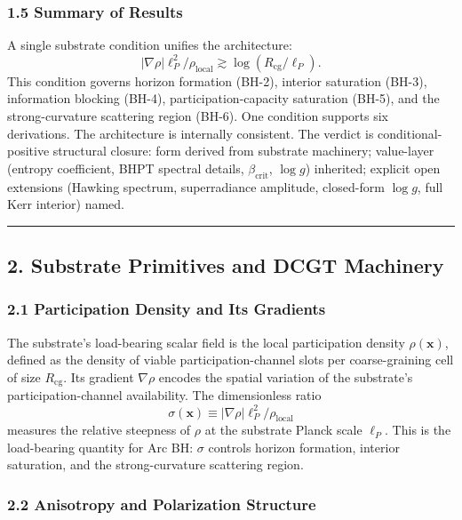 \documentclass[
  11pt,
  a4paper,
]{article}
\begin{document}
\subsubsection{1.5 Summary of Results}\label{summary-of-results}

A single substrate condition unifies the architecture: \[
|\nabla\rho|\ell_P^2/\rho_\mathrm{local} \gtrsim \log(R_\mathrm{cg}/\ell_P).
\] This condition governs horizon formation (BH-2), interior saturation
(BH-3), information blocking (BH-4), participation-capacity saturation
(BH-5), and the strong-curvature scattering region (BH-6). One condition
supports six derivations. The architecture is internally consistent. The
verdict is conditional-positive structural closure: form derived from
substrate machinery; value-layer (entropy coefficient, BHPT spectral
details, \(\beta_\mathrm{crit}\), \(\log g\)) inherited; explicit open
extensions (Hawking spectrum, superradiance amplitude, closed-form
\(\log g\), full Kerr interior) named.

\begin{center}\rule{0.5\linewidth}{0.5pt}\end{center}

\subsection{2. Substrate Primitives and DCGT
Machinery}\label{substrate-primitives-and-dcgt-machinery}

\subsubsection{2.1 Participation Density and Its
Gradients}\label{participation-density-and-its-gradients}

The substrate's load-bearing scalar field is the local participation
density \(\rho(\mathbf{x})\), defined as the density of viable
participation-channel slots per coarse-graining cell of size
\(R_\mathrm{cg}\). Its gradient \(\nabla\rho\) encodes the spatial
variation of the substrate's participation-channel availability. The
dimensionless ratio \[
\sigma(\mathbf{x}) \equiv |\nabla\rho|\ell_P^2/\rho_\mathrm{local}
\] measures the relative steepness of \(\rho\) at the substrate Planck
scale \(\ell_P\). This is the load-bearing quantity for Arc BH:
\(\sigma\) controls horizon formation, interior saturation, and the
strong-curvature scattering region.

\subsubsection{2.2 Anisotropy and Polarization
Structure}\label{anisotropy-and-polarization-structure}
\end{document}
